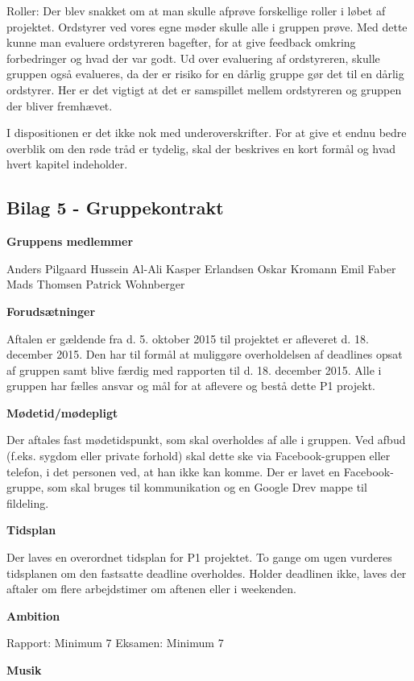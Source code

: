 Roller: Der blev snakket om at man skulle afprøve forskellige roller i løbet af projektet. Ordstyrer ved vores egne møder skulle alle i gruppen prøve. Med dette kunne man evaluere ordstyreren bagefter, for at give feedback omkring forbedringer og hvad der var godt. Ud over evaluering af ordstyreren, skulle gruppen også evalueres, da der er risiko for en dårlig gruppe gør det til en dårlig ordstyrer. Her er det vigtigt at det er samspillet mellem ordstyreren og gruppen der bliver fremhævet.

I dispositionen er det ikke nok med underoverskrifter. For at give et endnu bedre overblik om den røde tråd er tydelig, skal der beskrives en kort formål og hvad hvert kapitel indeholder.




\subsection{Bilag 5 - Gruppekontrakt} \label{sec:Bilag5}


\textbf{Gruppens medlemmer}

Anders Pilgaard
Hussein Al-Ali	
Kasper Erlandsen
Oskar Kromann
Emil Faber
Mads Thomsen
Patrick Wohnberger

\textbf{Forudsætninger}

Aftalen er gældende fra d. 5. oktober 2015 til projektet er afleveret d. 18. december 2015. Den har til formål at muliggøre overholdelsen af deadlines opsat af gruppen samt blive færdig med rapporten til d. 18. december 2015. 
Alle i gruppen har fælles ansvar og mål for at aflevere og bestå dette P1 projekt. 

\textbf{Mødetid/mødepligt}

Der aftales fast mødetidspunkt, som skal overholdes af alle i gruppen. Ved afbud (f.eks. sygdom eller private forhold) skal dette ske via Facebook-gruppen eller telefon, i det personen ved, at han ikke kan komme. Der er lavet en Facebook-gruppe, som skal bruges til kommunikation og en Google Drev mappe til fildeling.

\textbf{Tidsplan}

Der laves en overordnet tidsplan for P1 projektet. To gange om ugen vurderes tidsplanen om den fastsatte deadline overholdes. Holder deadlinen ikke, laves der aftaler om flere arbejdstimer om aftenen eller i weekenden. 

\textbf{Ambition}

Rapport: Minimum 7
Eksamen: Minimum 7

\textbf{Musik}

